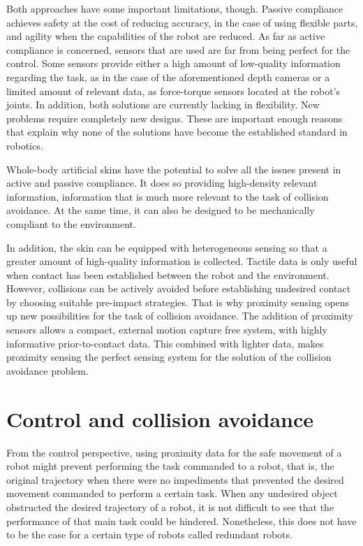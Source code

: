 Both approaches have some important limitations, though. Passive compliance achieves safety at the cost of reducing accuracy, in the case of using flexible parts, and agility when the capabilities of the robot are reduced. As far as active compliance is concerned, sensors that are used are far from being perfect for the control. Some sensors provide either a high amount of low-quality information regarding the task, as in the case of the aforementioned depth cameras or a limited amount of relevant data, as force-torque sensors located at the robot’s joints. In addition, both solutions are currently lacking in flexibility. New problems require completely new designs. These are important enough reasons that explain why none of the solutions have become the established standard in robotics.

Whole-body artificial skins have the potential to solve all the issues present in active and passive compliance. It does so providing high-density relevant information, information that is much more relevant to the task of collision avoidance. At the same time, it can also be designed to be mechanically compliant to the environment.


In addition, the skin can be equipped with heterogeneous sensing so that a greater amount of high-quality information is collected. Tactile data is only useful when contact has been established between the robot and the environment. However, collisions can be actively avoided before establishing undesired contact by choosing suitable pre-impact strategies. That is why  proximity sensing opens up new possibilities for the task of collision avoidance. The addition of proximity sensors allows a compact, external motion capture free system, with highly informative prior-to-contact data. This combined with lighter data, makes proximity sensing the perfect sensing system for the solution of the collision avoidance problem.

\section{Control and collision avoidance}
From the control perspective, using proximity data for the safe movement of a robot might prevent performing the task commanded to a robot, that is, the original trajectory when there were no impediments that prevented the desired movement commanded to perform a certain task. When any undesired object obstructed the desired trajectory of a robot, it is not difficult to see that the performance of that main task could be hindered. Nonetheless, this does not have to be the case for a certain type of robots called redundant robots.

